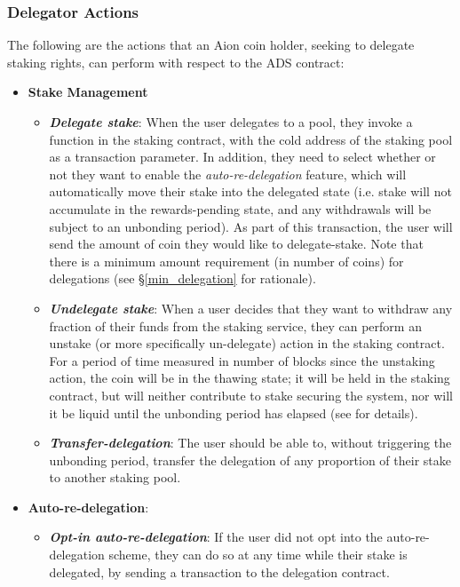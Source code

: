 \subsubsection{Delegator Actions}
The following are the actions that an Aion coin holder, seeking to delegate staking rights, can perform with respect to the ADS contract: 
\begin{itemize}
    \item \textbf{Stake Management}
    \begin{itemize}
        \item \textit{\textbf{Delegate stake}}: When the user delegates to a pool, they invoke a function in the staking contract, with the cold address of the staking pool as a transaction parameter. In addition, they need to select whether or not they want to enable the \textit{auto-re-delegation} feature, which will automatically move their stake into the delegated state (i.e. stake will not accumulate in the rewards-pending state, and any withdrawals will be subject to an unbonding period). As part of this transaction, the user will send the amount of coin they would like to delegate-stake. Note that there is a minimum amount requirement (in number of coins) for delegations (see \S\ref{min_delegation} for rationale). 
        \item \textit{\textbf{Undelegate stake}}: When a user decides that they want to withdraw any fraction of their funds from the staking service, they can perform an unstake (or more specifically un-delegate) action in the staking contract. For a period of time measured in number of blocks since the unstaking action, the coin will be in the thawing state; it will be held in the staking contract, but will neither contribute to stake securing the system, nor will it be liquid until the unbonding period has elapsed (see \cite{WZS19} for details).
        \item \textit{\textbf{Transfer-delegation}}: The user should be able to, without triggering the unbonding period, transfer the delegation of any proportion of their stake to another staking pool.
    \end{itemize}
    \item \textbf{Auto-re-delegation}: 
    \begin{itemize}
        \item \textit{\textbf{Opt-in auto-re-delegation}}: If the user did not opt into the auto-re-delegation scheme, they can do so at any time while their stake is delegated, by sending a transaction to the delegation contract. 

\end{itemize}
\end{itemize}
